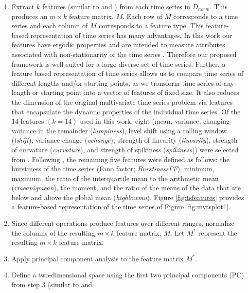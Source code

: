 \documentclass[12pt]{article}
\begin{document}
\begin{enumerate}
\def\labelenumi{\arabic{enumi}.}
\item
  Extract \(k\) features (similar to \citet{fulcher2012highly} and
  \citet{hyndman2015large}) from each time series in \(D_{norm}\). This
  produces an \(m\times k\) feature matrix, \(M\). Each row of \(M\)
  corresponds to a time series and each column of \(M\) corresponds to a
  feature type. This feature-based representation of time series has
  many advantages. In this work our features have ergodic properties and
  are intended to measure attributes associated with non-stationarity of
  the time series \citep{kang2018efficient}. Therefore our proposed
  framework is well-suited for a large diverse set of time series.
  Further, a feature based representation of time series allows us to
  compare time series of different lengths and/or starting points, as we
  transform time series of any length or starting point into a vector of
  features of fixed size. It also reduces the dimension of the original
  multivariate time series problem via features that encapsulate the
  dynamic properties of the individual time series. Of the 14 features
  \((k = 14)\) used in this work, eight (mean, variance, changing
  variance in the remainder (\emph{lumpiness}), level shift using a
  rolling window (\emph{lshift}), variance change (\emph{vchange}),
  strength of linearity (\emph{linearity}), strength of curvature
  (\emph{curvature}), and strength of spikiness (\emph{spikiness})) were
  selected from \citet{hyndman2015large}. Following
  \citet{fulcher2012highly}, the remaining five features were defined as
  follows: the burstiness of the time series (Fano factor;
  \emph{BurstinessFF}), minimum, maximum, the ratio of the interquartile
  mean to the arithmetic mean (\emph{rmeaniqmean}), the moment, and the
  ratio of the means of the data that are below and above the global
  mean (\emph{highlowmu}). Figure \ref{fig:tsfeatures} provides a
  feature-based representation of the time series of Figure
  \ref{fig:mvtsplot1}.
\item
  Since different operations produce features over different ranges,
  normalize the columns of the resulting \(m\times k\) feature matrix,
  \(M\). Let \(M^{*}\) represent the resulting \(m\times k\) feature
  matrix.
\item
  Apply principal component analysis to the feature matrix \(M^{*}\).
\item
  Define a two-dimensional space using the first two principal
  components (PC) from step 3 (similar to \citet{hyndman2015large} and

\end{enumerate}
\end{document}
